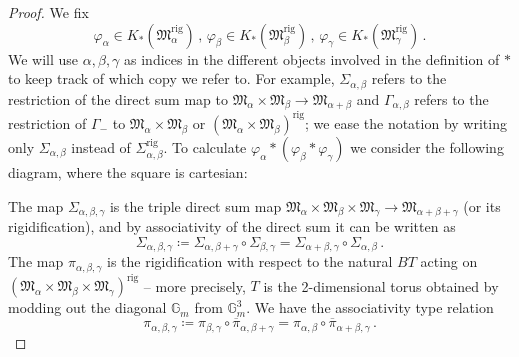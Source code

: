 \documentclass[10pt,a4paper]{amsart}
\newcommand{\BG}{{\mathbb{G}}}
\newcommand{\FM}{{\mathfrak{M}}}
\newcommand{\rig}{\mathrm{rig}}
\begin{document}
\begin{proof}
We fix
\[\varphi_\alpha\in K_\ast(\FM^\rig_\alpha)\,,\,\varphi_\beta\in K_\ast(\FM^\rig_\beta)\,,\,\varphi_\gamma\in K_\ast(\FM^\rig_\gamma)\,.\]
We will use $\alpha, \beta, \gamma$ as indices in the different objects involved in the definition of $\ast$ to keep track of which copy we refer to. For example, $\Sigma_{\alpha, \beta}$ refers to the restriction of the direct sum map to $\FM_\alpha\times \FM_\beta\to \FM_{\alpha+\beta}$ and $\Gamma_{\alpha, \beta}$ refers to the restriction of $\Gamma_-$ to $\FM_\alpha\times \FM_\beta$ or $(\FM_\alpha\times \FM_\beta)^\rig$; we ease the notation by writing only $\Sigma_{\alpha, \beta}$ instead of $\Sigma^\rig_{\alpha, \beta}$. To calculate $\varphi_\alpha\ast(\varphi_\beta\ast \varphi_\gamma)$ we consider the following diagram, where the square is cartesian:
\begin{center}
\end{center}
The map $\Sigma_{\alpha, \beta, \gamma}$ is the triple direct sum map $\FM_{\alpha}\times \FM_\beta\times \FM_\gamma\to \FM_{\alpha+ \beta+ \gamma}$ (or its rigidification), and by associativity of the direct sum it can be written as
\[\Sigma_{\alpha, \beta, \gamma}\coloneqq \Sigma_{\alpha, \beta+\gamma}\circ \Sigma_{\beta,\gamma}=\Sigma_{\alpha+\beta, \gamma}\circ\Sigma_{\alpha, \beta}\,.\]
The map $\pi_{\alpha, \beta, \gamma}$ is the rigidification with respect to the natural $BT$ acting on  $(\FM_\alpha\times \FM_\beta\times \FM_\gamma)^\rig$ -- more precisely, $T$ is the 2-dimensional torus obtained by modding out the diagonal $\BG_m$ from $\BG_m^3$. We have the associativity type relation
\[\pi_{\alpha, \beta, \gamma}\coloneqq \pi_{\beta, \gamma}\circ \overline \pi_{\alpha, \beta+\gamma}=\pi_{\alpha, \beta}\circ \overline \pi_{\alpha+\beta, \gamma}\,.\]


\end{proof}
\end{document}
